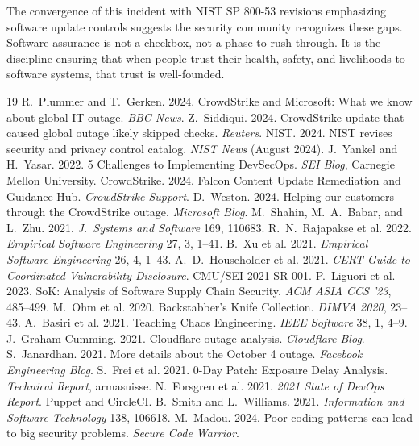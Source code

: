 \documentclass[sigconf,nonacm]{acmart}
\begin{document}
The convergence of this incident with NIST SP 800-53 revisions emphasizing software update
controls suggests the security community recognizes these gaps. Software assurance is not a
checkbox, not a phase to rush through. It is the discipline ensuring that when people trust
their health, safety, and livelihoods to software systems, that trust is well-founded.

\sloppy

\begin{thebibliography}{19}
 R.~Plummer and T.~Gerken. 2024. CrowdStrike and Microsoft: What we know about global IT outage. \textit{BBC News}.
 Z.~Siddiqui. 2024. CrowdStrike update that caused global outage likely skipped checks. \textit{Reuters}.
 NIST. 2024. NIST revises security and privacy control catalog. \textit{NIST News} (August 2024).
 J.~Yankel and H.~Yasar. 2022. 5 Challenges to Implementing DevSecOps. \textit{SEI Blog}, Carnegie Mellon University.
 CrowdStrike. 2024. Falcon Content Update Remediation and Guidance Hub. \textit{CrowdStrike Support}.
 D.~Weston. 2024. Helping our customers through the CrowdStrike outage. \textit{Microsoft Blog}.
 M.~Shahin, M.~A.~Babar, and L.~Zhu. 2021. \textit{J.\ Systems and Software} 169, 110683.
 R.~N.~Rajapakse et al. 2022. \textit{Empirical Software Engineering} 27, 3, 1--41.
 B.~Xu et al. 2021. \textit{Empirical Software Engineering} 26, 4, 1--43.
 A.~D.~Householder et al. 2021. \textit{CERT Guide to Coordinated Vulnerability Disclosure}. CMU/SEI-2021-SR-001.
 P.~Liguori et al. 2023. SoK: Analysis of Software Supply Chain Security. \textit{ACM ASIA CCS '23}, 485--499.
 M.~Ohm et al. 2020. Backstabber's Knife Collection. \textit{DIMVA 2020}, 23--43.
 A.~Basiri et al. 2021. Teaching Chaos Engineering. \textit{IEEE Software} 38, 1, 4--9.
 J.~Graham-Cumming. 2021. Cloudflare outage analysis. \textit{Cloudflare Blog}.
 S.~Janardhan. 2021. More details about the October 4 outage. \textit{Facebook Engineering Blog}.
 S.~Frei et al. 2021. 0-Day Patch: Exposure Delay Analysis. \textit{Technical Report}, armasuisse.
 N.~Forsgren et al. 2021. \textit{2021 State of DevOps Report}. Puppet and CircleCI.
 B.~Smith and L.~Williams. 2021. \textit{Information and Software Technology} 138, 106618.
 M.~Madou. 2024. Poor coding patterns can lead to big security problems. \textit{Secure Code Warrior}.
\end{thebibliography}
\end{document}
